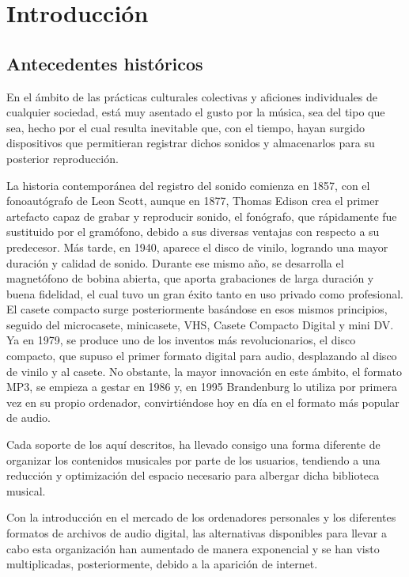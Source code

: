 \chapter{Introducción}
\label{cap:introduccion}

\section{Antecedentes históricos}

En el ámbito de las prácticas culturales colectivas y aficiones individuales de cualquier sociedad, está muy asentado el gusto por la música, sea del tipo que sea, hecho por el cual resulta inevitable que, con el tiempo, hayan surgido dispositivos que permitieran registrar dichos sonidos y almacenarlos para su posterior reproducción.

La historia contemporánea del registro del sonido comienza en 1857, con el fonoautógrafo de Leon Scott, aunque en 1877, Thomas Edison crea el primer artefacto capaz de grabar y reproducir sonido, el fonógrafo, que rápidamente fue sustituido por el gramófono, debido a sus diversas ventajas con respecto a su predecesor. Más tarde, en 1940, aparece el disco de vinilo, logrando una mayor duración y calidad de sonido. Durante ese mismo año, se desarrolla el magnetófono de bobina abierta, que aporta grabaciones de larga duración y buena fidelidad, el cual tuvo un gran éxito tanto en uso privado como profesional. El casete compacto surge posteriormente basándose en esos mismos principios, seguido del microcasete, minicasete, VHS, Casete Compacto Digital y mini DV. Ya en 1979, se produce uno de los inventos más revolucionarios, el disco compacto, que supuso el primer formato digital para audio, desplazando al disco de vinilo y al casete. No obstante, la mayor innovación en este ámbito, el formato MP3, se empieza a gestar en 1986 y, en 1995 Brandenburg lo utiliza por primera vez en su propio ordenador, convirtiéndose hoy en día en el formato más popular de audio.

Cada soporte de los aquí descritos, ha llevado consigo una forma diferente de organizar los contenidos musicales por parte de los usuarios, tendiendo a una reducción y optimización del espacio necesario para albergar dicha biblioteca musical. 

Con la introducción en el mercado de los ordenadores personales y los diferentes formatos de archivos de audio digital, las alternativas disponibles para llevar a cabo esta organización han aumentado de manera exponencial y se han visto multiplicadas, posteriormente, debido a la aparición de internet.

